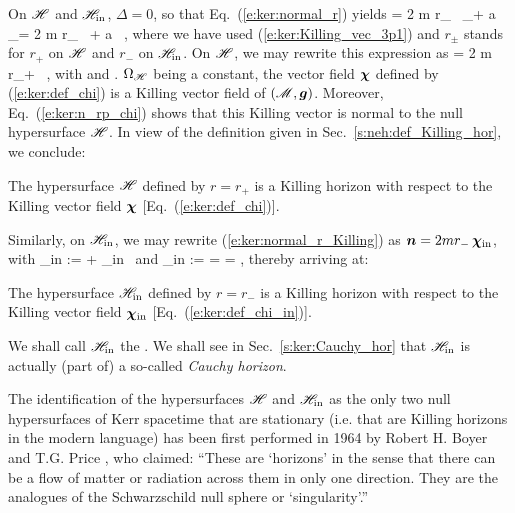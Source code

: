 On $\mathscr{H}$ and $\mathscr{H}_{\rm in}$, $\Delta=0$, so that
Eq.~(\ref{e:ker:normal_r})
yields
\be \label{e:ker:normal_r_Killing}
     = 2 m r_{\pm} \, \wpar_\ti + a \, \wpar_\tph = 2 m r_{\pm} \, \w{\xi}
        + a \, \w{\eta} ,
\ee
where we have used (\ref{e:ker:Killing_vec_3p1}) and $r_{\pm}$ stands for
$r_+$ on $\mathscr{H}$ and $r_-$ on $\mathscr{H}_{\rm in}$.
On $\mathscr{H}$, we may rewrite this expression as
\be \label{e:ker:n_rp_chi}
     = 2 m r_+ \, \w{\chi} ,
\ee
with
\be \label{e:ker:def_chi}
    \encadre{\w{\chi} := \w{\xi} + \Omega_{\Hor} \, \w{\eta} }
\ee
and
\be \label{e:ker:def_OmegaH}
    .
\ee
$\Omega_{\mathscr{H}}$ being a constant, the vector field $\bm{\chi}$ defined by
(\ref{e:ker:def_chi}) is a Killing vector field of $(\mathscr{M},\bm{g})$.
Moreover, Eq.~(\ref{e:ker:n_rp_chi})
shows that this Killing vector is normal to the null hypersurface $\mathscr{H}$.
In view of the definition given in Sec.~\ref{s:neh:def_Killing_hor}, we
conclude:
\begin{prop}
\label{p:ker:H_Killing}
The hypersurface $\mathscr{H}$ defined by $r=r_+$ is a Killing horizon with respect to the Killing vector field $\bm{\chi}$
[Eq.~(\ref{e:ker:def_chi})].
\end{prop}

Similarly, on $\mathscr{H}_{\rm in}$, we may rewrite (\ref{e:ker:normal_r_Killing})
as $\bm{n} = 2 m r_- \, \bm{\chi}_{\rm in}$, with
\be \label{e:ker:def_chi_in}
    \w{\chi}_{\rm in} := \w{\xi} + \Omega_{\rm in} \, \w{\eta}
\ee
and
\be \label{e:ker:def_Omega_in}
    \Omega_{\rm in} :=  = 
        =  ,
\ee
thereby arriving at:
\begin{prop}
The hypersurface $\mathscr{H}_{\rm in}$ defined by $r=r_-$ is a Killing horizon with respect to the Killing vector field $\bm{\chi}_{\rm in}$
[Eq.~(\ref{e:ker:def_chi_in})].
\end{prop}
We shall call $\mathscr{H}_{\rm in}$ the . We shall see in Sec.~\ref{s:ker:Cauchy_hor} that $\mathscr{H}_{\rm in}$
is actually (part of) a so-called \emph{Cauchy horizon}.

\begin{hist}
The identification of the hypersurfaces $\mathscr{H}$ and $\mathscr{H}_{\rm in}$
as the only two null hypersurfaces of Kerr spacetime that are stationary
(i.e. that are Killing horizons in the modern language) has been first performed in
1964 by Robert H. Boyer
and T.G. Price \cite{BoyerP65}, who claimed: ``These are `horizons'
in the sense that there can be a flow of matter or radiation across them in only one direction.
They are the analogues of the Schwarzschild null sphere or `singularity'.''
\end{hist}

